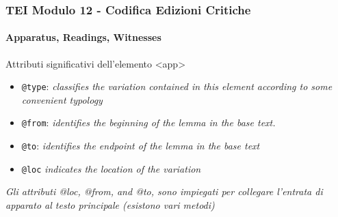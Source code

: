 \begin{frame}
    \frametitle{TEI Modulo 12 - Codifica Edizioni Critiche}
    \framesubtitle{Apparatus, Readings, Witnesses}
    \addtocounter{nframe}{1}












    \begin{block}{Attributi significativi dell'elemento <app>}
        \begin{itemize}
            \item \texttt{@type}: \textit{classifies the variation contained in this element according to some convenient typology}
            \item \texttt{@from}: \textit{identifies the beginning of the lemma in the base text.}
            \item \texttt{@to}: \textit{identifies the endpoint of the lemma in the base text}
            \item \texttt{@loc} \textit{indicates the location of the variation}
        \end{itemize}
    \end{block}

    \textit{Gli attributi @loc, @from, and @to, sono impiegati per collegare l'entrata di apparato al testo principale (esistono vari metodi)}


\end{frame}

